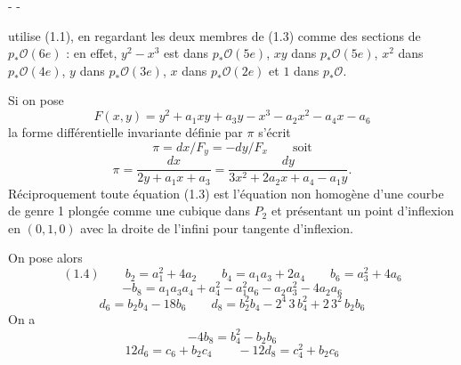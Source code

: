 -  -

utilise (1.1), en regardant les deux membres de (1.3) comme des sections de $p_*\mathcal O(6e)$ : en effet, $y^2-x^3$ est dans $p_*\mathcal O(5e)$, $xy$ dans $p_*\mathcal O(5e)$, $x^2$ dans $p_*\mathcal O(4e)$, $y$ dans $p_*\mathcal O(3e)$, $x$ dans $p_*\mathcal O(2e)$ et $1$ dans $p_*\mathcal O$.

Si on pose
\[
F(x,y)=y^2+a_1xy+a_3y-x^3-a_2x^2-a_4x-a_6
\]
la forme différentielle invariante définie par $\pi$ s'écrit
\[
\pi=dx/F_y=-dy/F_x\qquad\text{soit}
\]
\[
\pi=\frac{dx}{2y+a_1x+a_3}=\frac{dy}{3x^2+2a_2x+a_4-a_1y}.
\]
Réciproquement toute équation (1.3) est l'équation non homogène d'une courbe de genre 1 plongée comme une cubique dans $P_2$ et présentant un point d'inflexion en $(0,1,0)$ avec la droite de l'infini pour tangente d'inflexion.

On pose alors
\[
(1.4)\qquad b_2=a_1^2+4a_2\qquad b_4=a_1a_3+2a_4\qquad b_6=a_3^2+4a_6
\]
\[
-b_8=a_1a_3a_4+a_4^2-a_1^2a_6-a_2a_3^2-4a_2a_6
\]
\[
d_6=b_2b_4-18b_6\qquad d_8=b_2^2b_4-2^4\,3\,b_4^2+2\,3^2\,b_2b_6
\]
On a
\[
-4b_8=b_4^2-b_2b_6
\]
\[
12d_6=c_6+b_2c_4\qquad -12d_8=c_4^2+b_2c_6
\]
